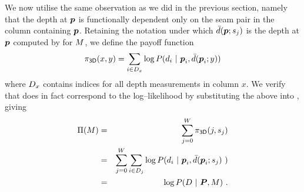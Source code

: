 We now utilise the same observation as we did in the previous section,
namely that the depth at $\Pixel$ is functionally dependent only on
the seam pair in the column containing $\Pixel$. Retaining the
notation under which $\ComputedDepth(\Pixel;\seam_j)$ is the depth at
$\Pixel$ computed by  for $\Scene$, we
define the payoff function
\begin{equation}
  \label{eq:depth-payoffs}
  \DepthPayoff(x,y) = 
  \sum_{i\in\Depths_x} \log P(\Depth_i~|~\Pixel_i,\ComputedDepth(\Pixel_i;y))
\end{equation}
where $\Depths_x$ contains indices for all depth measurements in
column $x$. We verify that  does in fact
correspond to the log--likelihood  by
substituting the above into , giving
\begin{eqnarray}
  \ScenePayoff(\Scene) &=& 
    \sum_{j=0}^W \DepthPayoff(j,\seam_j)\\
  &=&
    \sum_{j=0}^W \sum_{i\in\Depths_j} 
    \log P(\Depth_i~|~\Pixel_i,\ComputedDepth(\Pixel_i;\seam_j)~)\\
  &=&
    \log P(\Depths ~|~ \Pixels, \Scene)~.
\end{eqnarray}

